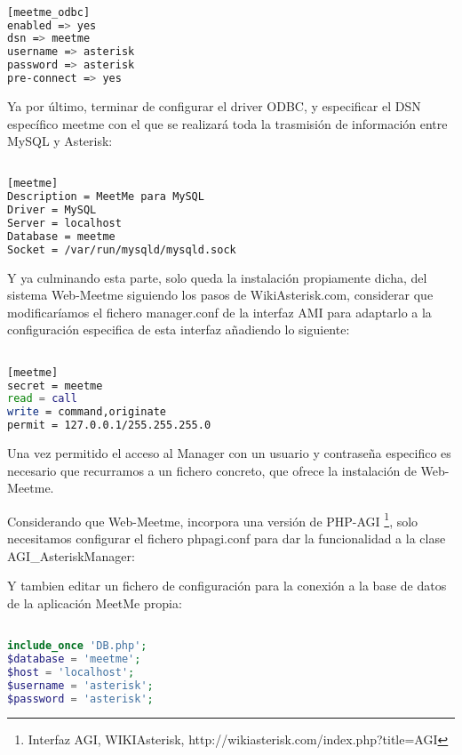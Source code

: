 \begin{lstlisting}[language=bash,title={/etc/asterisk/res\_odbc.conf}]

[meetme_odbc]
enabled => yes
dsn => meetme
username => asterisk
password => asterisk
pre-connect => yes

\end{lstlisting}

Ya por último, terminar de configurar el driver ODBC, y especificar el DSN específico meetme con el que se realizará toda la trasmisión de información entre MySQL y Asterisk:

\begin{lstlisting}[language=bash,title={/etc/odbc.ini}]

[meetme]
Description = MeetMe para MySQL
Driver = MySQL
Server = localhost
Database = meetme
Socket = /var/run/mysqld/mysqld.sock

\end{lstlisting}

Y ya culminando esta parte, solo queda la instalación propiamente dicha, del sistema Web-Meetme siguiendo los pasos de WikiAsterisk.com, considerar que modificaríamos el fichero manager.conf de la interfaz AMI para adaptarlo a la configuración especifica de esta interfaz añadiendo lo siguiente:

\begin{lstlisting}[language=bash,title={/etc/asterisk/manager.conf}]

[meetme]
secret = meetme 
read = call
write = command,originate
permit = 127.0.0.1/255.255.255.0

\end{lstlisting}

Una vez permitido el acceso al Manager con un usuario y contraseña especifico es necesario que recurramos a un fichero concreto, que ofrece la instalación de Web-Meetme. 

Considerando que Web-Meetme, incorpora una versión de PHP-AGI \footnote{Interfaz AGI, WIKIAsterisk, http://wikiasterisk.com/index.php?title=AGI}, solo necesitamos configurar el fichero phpagi.conf para dar la funcionalidad a la clase AGI\_AsteriskManager:



Y tambien editar un fichero de configuración para la conexión a la base de datos de la aplicación MeetMe propia:

\begin{lstlisting}[language=php,title={/var/www/web-meetme/lib/database.php}]

include_once 'DB.php';
$database = 'meetme';
$host = 'localhost';
$username = 'asterisk';
$password = 'asterisk';

\end{lstlisting}

